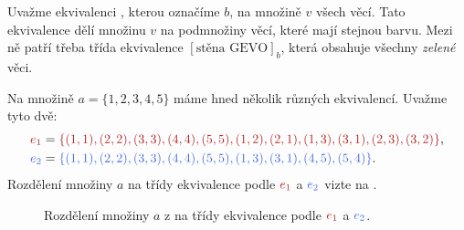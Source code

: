 \begin{example}
  \label{exam:trida-ekvivalence-3}
  Uvažme ekvivalenci , kterou označíme $b$, na množině $v$
  všech věcí. Tato ekvivalence dělí množinu $v$ na podmnožiny věcí, které mají
  stejnou barvu. Mezi ně patří třeba třída ekvivalence $[\text{stěna GEVO}]_b$,
  která obsahuje všechny \emph{zelené} věci.
\end{example}

\begin{example}
  \label{exam:trida-ekvivalence-4}
  Na množině $a = \{1, 2, 3, 4, 5\}$ máme hned několik různých ekvivalencí.
  Uvažme tyto dvě:
  \begin{align*}
    \clr{e_1} &= \clr{\{(1, 1), (2, 2), (3, 3), (4, 4), (5, 5), (1, 2), (2, 1),
    (1, 3), (3, 1), (2, 3), (3, 2)\}},\\
    \clb{e_2} &= \clb{\{(1, 1), (2, 2), (3, 3), (4, 4), (5, 5), (1, 3), (3, 1),
    (4, 5), (5, 4)\}}.
  \end{align*}
  Rozdělení množiny $a$ na třídy ekvivalence podle $\clr{e_1}$ a $\clb{e_2}$
  vizte na .
\end{example}

\begin{figure}[ht]
  \centering

  \caption{Rozdělení množiny $a$ z  na
  třídy ekvivalence podle $\clr{e_1}$ a $\clb{e_2}$.}
  \label{fig:trida-ekvivalence-4}
\end{figure}

